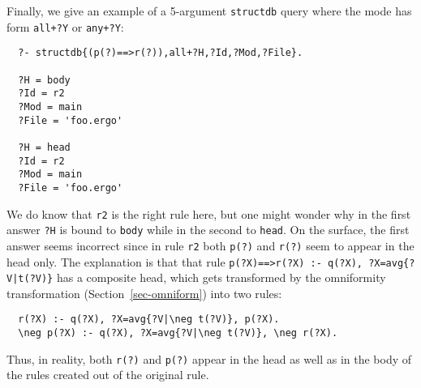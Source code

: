 Finally, we give an example of a 5-argument \texttt{structdb} query where
the mode has form \texttt{all+?Y}  or \texttt{any+?Y}:
\begin{verbatim}
  ?- structdb{(p(?)==>r(?)),all+?H,?Id,?Mod,?File}.

  ?H = body
  ?Id = r2
  ?Mod = main
  ?File = 'foo.ergo'

  ?H = head
  ?Id = r2
  ?Mod = main
  ?File = 'foo.ergo'
\end{verbatim}
We do know that \texttt{r2} is the right rule here, but 
one might wonder why in the first answer \texttt{?H} is bound to
\texttt{body} while in the second to \texttt{head}. On the surface,
the first answer seems incorrect since in rule \texttt{r2} both
\texttt{p(?)} and \texttt{r(?)} seem to appear in the head only.   
The explanation is that that rule
  \texttt{p(?X)==>r(?X) :- q(?X), ?X=avg\{?V|\RULELOGNEG t(?V)\}}
has a composite head, which gets
transformed by the omniformity transformation (Section~\ref{sec-omniform})
into two rules:
\begin{verbatim}
  r(?X) :- q(?X), ?X=avg{?V|\neg t(?V)}, p(?X).
  \neg p(?X) :- q(?X), ?X=avg{?V|\neg t(?V)}, \neg r(?X).
\end{verbatim}
Thus, in reality, both \texttt{r(?)} and \texttt{p(?)} appear in the
head as well as in the body of the rules created out of the original rule.


